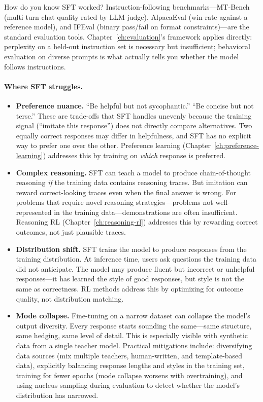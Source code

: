 \noindent How do you know SFT worked? Instruction-following benchmarks---MT-Bench (multi-turn chat quality rated by LLM judge), AlpacaEval (win-rate against a reference model), and IFEval (binary pass/fail on format constraints)---are the standard evaluation tools. Chapter~\ref{ch:evaluation}'s framework applies directly: perplexity on a held-out instruction set is necessary but insufficient; behavioral evaluation on diverse prompts is what actually tells you whether the model follows instructions.

\paragraph{Where SFT struggles.}

\begin{itemize}[nosep]
  \item \textbf{Preference nuance.} ``Be helpful but not sycophantic.'' ``Be concise but not terse.'' These are trade-offs that SFT handles unevenly because the training signal (``imitate this response'') does not directly compare alternatives. Two equally correct responses may differ in helpfulness, and SFT has no explicit way to prefer one over the other. Preference learning (Chapter~\ref{ch:preference-learning}) addresses this by training on \emph{which} response is preferred.
  \item \textbf{Complex reasoning.} SFT can teach a model to produce chain-of-thought reasoning \emph{if} the training data contains reasoning traces. But imitation can reward correct-looking traces even when the final answer is wrong. For problems that require novel reasoning strategies---problems not well-represented in the training data---demonstrations are often insufficient. Reasoning RL (Chapter~\ref{ch:reasoning-rl}) addresses this by rewarding correct outcomes, not just plausible traces.
  \item \textbf{Distribution shift.} SFT trains the model to produce responses from the training distribution. At inference time, users ask questions the training data did not anticipate. The model may produce fluent but incorrect or unhelpful responses---it has learned the style of good responses, but style is not the same as correctness. RL methods address this by optimizing for outcome quality, not distribution matching.
  \item \textbf{Mode collapse.} Fine-tuning on a narrow dataset can collapse the model's output diversity. Every response starts sounding the same---same structure, same hedging, same level of detail. This is especially visible with synthetic data from a single teacher model. Practical mitigations include: diversifying data sources (mix multiple teachers, human-written, and template-based data), explicitly balancing response lengths and styles in the training set, training for fewer epochs (mode collapse worsens with overtraining), and using nucleus sampling during evaluation to detect whether the model's distribution has narrowed.
\end{itemize}

